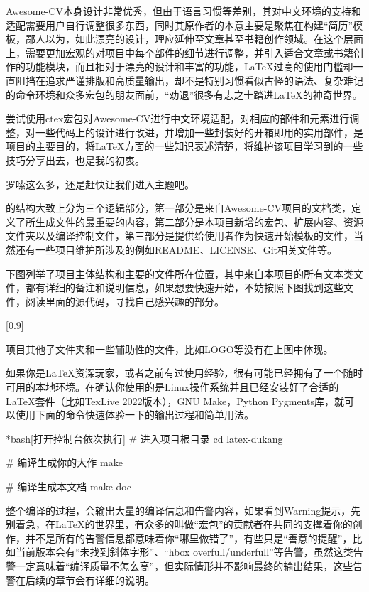 Awesome-CV本身设计非常优秀，但由于语言习惯等差别，其对中文环境的支持和适配需要用户自行调整很多东西，同时其原作者的本意主要是聚焦在构建“简历”模板，鄙人以为，如此漂亮的设计，理应延伸至文章甚至书籍创作领域。在这个层面上，需要更加宏观的对项目中每个部件的细节进行调整，并引入适合文章或书籍创作的功能模块，而且相对于漂亮的设计和丰富的功能，{\LaTeX}过高的使用门槛却一直阻挡在追求严谨排版和高质量输出，却不是特别习惯看似古怪的语法、复杂难记的命令环境和众多宏包的朋友面前，“劝退”很多有志之士踏进{\LaTeX}的神奇世界。

尝试使用ctex宏包对Awesome-CV进行中文环境适配，对相应的部件和元素进行调整，对一些代码上的设计进行改进，并增加一些封装好的开箱即用的实用部件，是{\dk}项目的主要目的，将{\LaTeX}方面的一些知识表述清楚，将维护该项目学习到的一些技巧分享出去，也是我的初衷。

罗嗦这么多，还是赶快让我们进入主题吧。

{\dk}的结构大致上分为三个逻辑部分，第一部分是来自Awesome-CV项目的文档类，定义了所生成文件的最重要的内容，第二部分是本项目新增的宏包、扩展内容、资源文件夹以及编译控制文件，第三部分是提供给使用者作为快速开始模板的文件，当然还有一些项目维护所涉及的例如README、LICENSE、Git相关文件等。

下图列举了项目主体结构和主要的文件所在位置，其中来自本项目的所有文本类文件，都有详细的备注和说明信息，如果想要{\color{awesome}快速开始}，不妨按照下图找到这些文件，阅读里面的源代码，寻找自己感兴趣的部分。

[0.9]

\begin{dkcomment}
  项目其他子文件夹和一些辅助性的文件，比如LOGO等没有在上图中体现。
\end{dkcomment}


如果你是{\LaTeX}资深玩家，或者之前有过使用经验，很有可能已经拥有了一个随时可用的本地环境。在确认你使用的是Linux操作系统并且已经安装好了合适的{\LaTeX}套件（比如TexLive 2022版本），GNU Make，Python Pygments库，就可以使用下面的命令快速体验一下{\dk}的输出过程和简单用法。

\begin{dkcode}*{bash}[打开控制台依次执行]
# 进入项目根目录
cd latex-dukang

# 编译生成你的大作
make

# 编译生成本文档
make doc
\end{dkcode}

整个编译的过程，会输出大量的编译信息和告警内容，如果看到Warning提示，先别着急，在{\LaTeX}的世界里，有众多的叫做“宏包”的贡献者在共同的支撑着你的创作，并不是所有的告警信息都意味着你“哪里做错了”，有些只是“善意的提醒”，比如{\dk}当前版本会有“未找到斜体字形”、“hbox overfull/underfull”等告警，虽然这类告警一定意味着“编译质量不怎么高”，但实际情形并不影响最终的输出结果，这些告警在后续的章节会有详细的说明。

